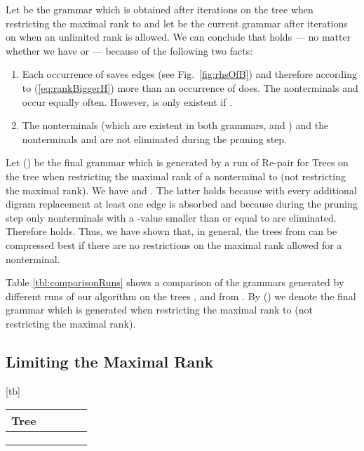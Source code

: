 \documentclass[12pt]{llncs}
\makeatletter
\renewenvironment{table}
               {\setlength\abovecaptionskip{10\p@}\setlength\belowcaptionskip{10\p@}\@float{table}}
               {\end@float}
\newcommand{\tp}{digram\xspace}
\makeatother
\begin{document}
Let  be the grammar which is obtained after  iterations on the tree  when restricting the maximal rank to  and let  be the current grammar after  iterations on  when an unlimited rank is allowed. We can conclude that  holds --- no matter whether we have  or  --- because of the following two facts:
\begin{enumerate}[(1)]
	\item Each occurrence of  saves  edges (see Fig.~\ref{fig:rhsOfB}) and therefore according to (\ref{eq:rankBiggerH}) more than an occurrence of  does. The nonterminals  and  occur equally often. However,  is only existent if .
	\item The nonterminals  (which are existent in both grammars,  and ) and the nonterminals  and  are not eliminated during the pruning step.
\end{enumerate}
Let  () be the final grammar which is generated by a run of Re-pair for Trees on the tree  when restricting the maximal rank of a nonterminal to  (not restricting the maximal rank). We have  and . The latter holds because with every additional \tp replacement at least one edge is absorbed and because during the pruning step only nonterminals with a -value smaller than or equal to  are eliminated. Therefore  holds. Thus, we have shown that, in general, the trees from  can be compressed best if there are no restrictions on the maximal rank allowed for a nonterminal.
\begin{example}
	Table \ref{tbl:comparisonRuns} shows a comparison of the grammars generated by different runs of our algorithm on the trees ,  and  from . By  () we denote the final grammar which is generated when restricting the maximal rank to  (not restricting the maximal rank).
\end{example}

\subsection{Limiting the Maximal Rank}\label{sec:limitingTheMaximalRank}

\begin{table}[tb]
	\centering
		\begin{tabular}{crrrr}
			\toprule
			Tree		&	&	&&\\
			\midrule
					&					&	&			&\\
					&					&	&			&\\
					&				&&			&\\
			\bottomrule
		\end{tabular}
	\caption{Comparison of the sizes of the final grammars.}\label{tbl:comparisonRuns}
\end{table}
\end{document}
